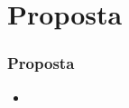 \section{Proposta}

\begin{frame}\frametitle{Proposta} 
\begin{itemize}
	\item 
\end{itemize}	
\end{frame}